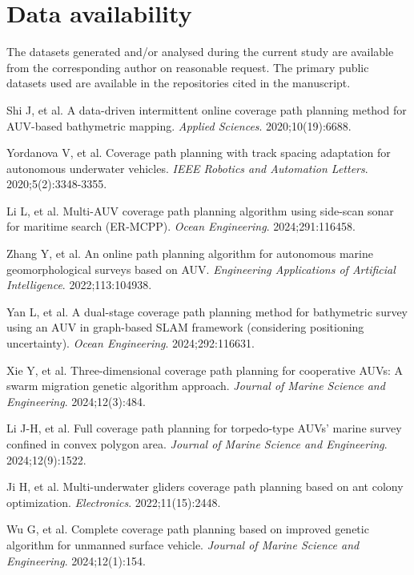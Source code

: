 \documentclass[compress]{cm}
\begin{document}
\section*{Data availability}
The datasets generated and/or analysed during the current study are available from the corresponding author on reasonable request. The primary public datasets used are available in the repositories cited in the manuscript.

\begin{thebibliography}{99}
Shi J, et al. A data-driven intermittent online coverage path planning method for AUV-based bathymetric mapping. \textit{Applied Sciences}. 2020;10(19):6688.

Yordanova V, et al. Coverage path planning with track spacing adaptation for autonomous underwater vehicles. \textit{IEEE Robotics and Automation Letters}. 2020;5(2):3348-3355.

Li L, et al. Multi-AUV coverage path planning algorithm using side-scan sonar for maritime search (ER-MCPP). \textit{Ocean Engineering}. 2024;291:116458.

Zhang Y, et al. An online path planning algorithm for autonomous marine geomorphological surveys based on AUV. \textit{Engineering Applications of Artificial Intelligence}. 2022;113:104938.

Yan L, et al. A dual-stage coverage path planning method for bathymetric survey using an AUV in graph-based SLAM framework (considering positioning uncertainty). \textit{Ocean Engineering}. 2024;292:116631.

Xie Y, et al. Three-dimensional coverage path planning for cooperative AUVs: A swarm migration genetic algorithm approach. \textit{Journal of Marine Science and Engineering}. 2024;12(3):484.

Li J-H, et al. Full coverage path planning for torpedo-type AUVs’ marine survey confined in convex polygon area. \textit{Journal of Marine Science and Engineering}. 2024;12(9):1522.

Ji H, et al. Multi-underwater gliders coverage path planning based on ant colony optimization. \textit{Electronics}. 2022;11(15):2448.

Wu G, et al. Complete coverage path planning based on improved genetic algorithm for unmanned surface vehicle. \textit{Journal of Marine Science and Engineering}. 2024;12(1):154.


\end{thebibliography}
\end{document}

